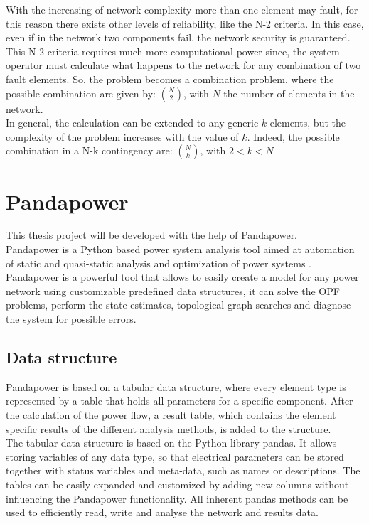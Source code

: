 With the increasing of network complexity more than one element may fault, for this reason there exists other levels of reliability, like the N-2 criteria. In this case, even if in the network two components fail, the network security is guaranteed. \\
This N-2 criteria requires much more computational power since, the system operator must calculate what happens to the network for any combination of two fault elements. So, the problem becomes a combination problem, where the possible combination are given by: $N \choose 2$, with $N$ the number of elements in the network. \\

In general, the calculation can be extended to any generic $k$ elements, but the complexity of the problem increases with the value of $k$. Indeed, the possible combination in a N-k contingency are: $N \choose k$, with $2 < k < N$


\section{Pandapower}
\label{ch:pandapower}
This thesis project will be developed with the help of Pandapower. \\
Pandapower is a Python based power system analysis tool aimed at automation of static and quasi-static analysis and optimization of power systems \cite{pandapower}. \\
Pandapower is a powerful tool that allows to easily create a model for any power network using customizable predefined data structures, it can solve the \gls{OPF} problems, perform the state estimates, topological graph searches and diagnose the system for possible errors.

\subsection{Data structure}
Pandapower is based on a tabular data structure, where every element type is represented by a table that holds all parameters for a specific component. After the calculation of the power flow, a result table, which contains the element specific results of the different analysis methods, is added to the structure. \\
The tabular data structure is based on the Python library pandas. It allows storing variables of any data type, so that electrical parameters can be stored together with status variables and meta-data, such as names or descriptions. The tables can be easily expanded and customized by adding new columns without influencing the Pandapower functionality. All inherent pandas methods can be used to efficiently read, write and analyse the network and results data. \\

